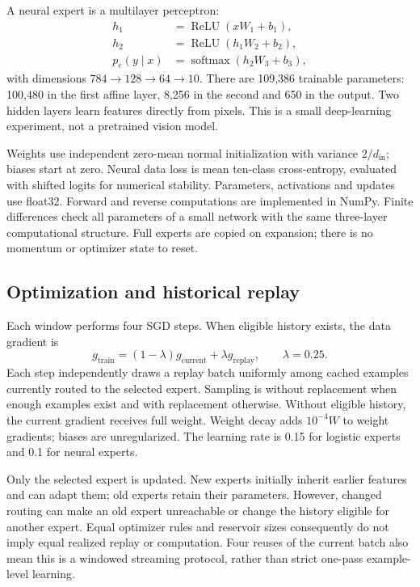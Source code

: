 A neural expert is a multilayer perceptron:
\begin{align}
h_1&=\operatorname{ReLU}(xW_1+b_1),\\
h_2&=\operatorname{ReLU}(h_1W_2+b_2),\\
p_e(y\mid x)&=\operatorname{softmax}(h_2W_3+b_3),
\end{align}
with dimensions \(784\!\rightarrow\!128\!\rightarrow\!64\!\rightarrow\!10\). There are 109,386 trainable parameters: 100,480 in the first affine layer, 8,256 in the second and 650 in the output. Two hidden layers learn features directly from pixels. This is a small deep-learning experiment, not a pretrained vision model.

Weights use independent zero-mean normal initialization with variance \(2/d_{\mathrm{in}}\); biases start at zero. Neural data loss is mean ten-class cross-entropy, evaluated with shifted logits for numerical stability. Parameters, activations and updates use float32. Forward and reverse computations are implemented in NumPy. Finite differences check all parameters of a small network with the same three-layer computational structure. Full experts are copied on expansion; there is no momentum or optimizer state to reset.

\subsection{Optimization and historical replay}
Each window performs four SGD steps. When eligible history exists, the data gradient is
\begin{equation}
g_{\mathrm{train}}=(1-\lambda)g_{\mathrm{current}}+\lambda g_{\mathrm{replay}},\qquad\lambda=0.25.
\end{equation}
Each step independently draws a replay batch uniformly among cached examples currently routed to the selected expert. Sampling is without replacement when enough examples exist and with replacement otherwise. Without eligible history, the current gradient receives full weight. Weight decay adds \(10^{-4}W\) to weight gradients; biases are unregularized. The learning rate is 0.15 for logistic experts and 0.1 for neural experts.

Only the selected expert is updated. New experts initially inherit earlier features and can adapt them; old experts retain their parameters. However, changed routing can make an old expert unreachable or change the history eligible for another expert. Equal optimizer rules and reservoir sizes consequently do not imply equal realized replay or computation. Four reuses of the current batch also mean this is a windowed streaming protocol, rather than strict one-pass example-level learning.

